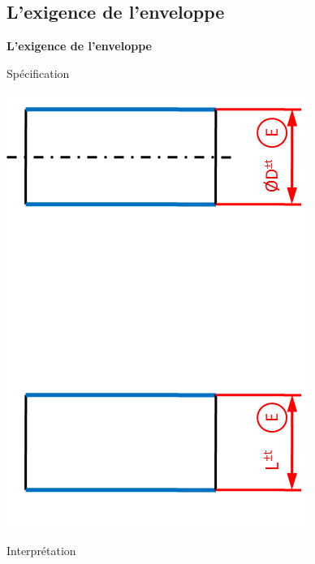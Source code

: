 \documentclass[11pt,oneside]{article}
\begin{document}
\newpage

\subsection{L'exigence de l'enveloppe}

\begin{resultat}
\textbf{L'exigence de l'enveloppe}

\begin{minipage}[t]{.3\linewidth}
\begin{center}
Spécification

\includegraphics[width=.95\textwidth]{png/linE}
\end{center}
\end{minipage} \hfill
\begin{minipage}[t]{.3\linewidth}
\begin{center}
Interprétation
\end{center}


\end{minipage}
\end{resultat}
\end{document}
